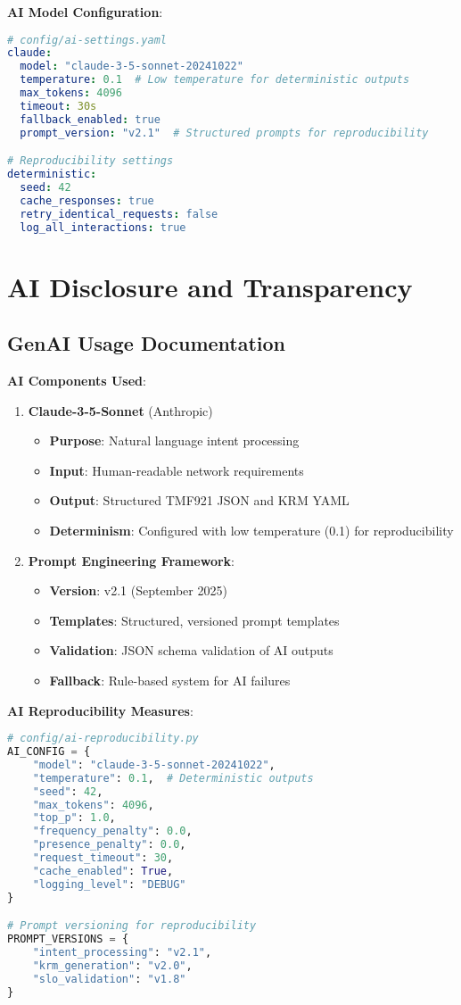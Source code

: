\documentclass[conference]{IEEEtran}
\begin{document}
\textbf{AI Model Configuration}:
\begin{lstlisting}[language=YAML]
# config/ai-settings.yaml
claude:
  model: "claude-3-5-sonnet-20241022"
  temperature: 0.1  # Low temperature for deterministic outputs
  max_tokens: 4096
  timeout: 30s
  fallback_enabled: true
  prompt_version: "v2.1"  # Structured prompts for reproducibility

# Reproducibility settings
deterministic:
  seed: 42
  cache_responses: true
  retry_identical_requests: false
  log_all_interactions: true
\end{lstlisting}

\section{AI Disclosure and Transparency}

\subsection{GenAI Usage Documentation}

\textbf{AI Components Used}:
\begin{enumerate}
\item \textbf{Claude-3-5-Sonnet} (Anthropic)
   \begin{itemize}
   \item \textbf{Purpose}: Natural language intent processing
   \item \textbf{Input}: Human-readable network requirements
   \item \textbf{Output}: Structured TMF921 JSON and KRM YAML
   \item \textbf{Determinism}: Configured with low temperature (0.1) for reproducibility
   \end{itemize}

\item \textbf{Prompt Engineering Framework}:
   \begin{itemize}
   \item \textbf{Version}: v2.1 (September 2025)
   \item \textbf{Templates}: Structured, versioned prompt templates
   \item \textbf{Validation}: JSON schema validation of AI outputs
   \item \textbf{Fallback}: Rule-based system for AI failures
   \end{itemize}
\end{enumerate}

\textbf{AI Reproducibility Measures}:
\begin{lstlisting}[language=Python]
# config/ai-reproducibility.py
AI_CONFIG = {
    "model": "claude-3-5-sonnet-20241022",
    "temperature": 0.1,  # Deterministic outputs
    "seed": 42,
    "max_tokens": 4096,
    "top_p": 1.0,
    "frequency_penalty": 0.0,
    "presence_penalty": 0.0,
    "request_timeout": 30,
    "cache_enabled": True,
    "logging_level": "DEBUG"
}

# Prompt versioning for reproducibility
PROMPT_VERSIONS = {
    "intent_processing": "v2.1",
    "krm_generation": "v2.0",
    "slo_validation": "v1.8"
}
\end{lstlisting}
\end{document}
